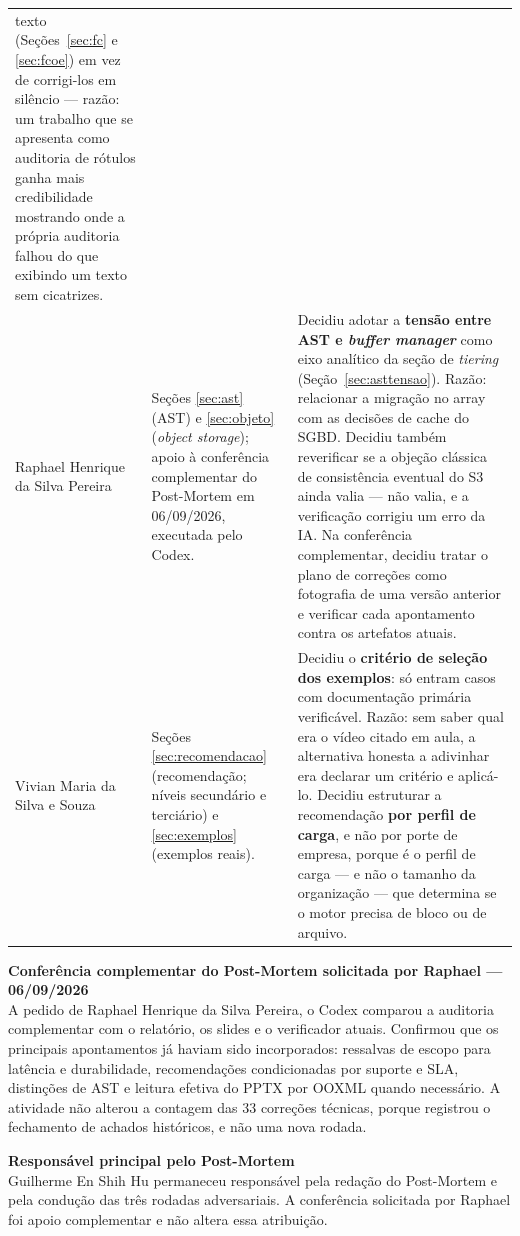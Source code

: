 \documentclass[11pt,a4paper]{article}
\newcommand{\destaque}[2]{%
  \begin{center}\begin{minipage}{0.96\textwidth}
  \colorbox{fundo}{\begin{minipage}{\dimexpr\linewidth-2\fboxsep}
  \vspace{2pt}\textbf{\color{azul}\small #1}\\[1pt]\footnotesize #2\vspace{3pt}
  \end{minipage}}\end{minipage}\end{center}}
\begin{document}
{\begin{longtable}{@{}p{3.7cm}p{4.3cm}p{6.3cm}@{}}
{texto} (Seções~\ref{sec:fc} e \ref{sec:fcoe}) em vez de corrigi-los em silêncio --- razão: um
trabalho que se apresenta como auditoria de rótulos ganha mais credibilidade mostrando onde a
própria auditoria falhou do que exibindo um texto sem cicatrizes. \\
\addlinespace
Raphael Henrique da Silva Pereira &
Seções \ref{sec:ast} (AST) e \ref{sec:objeto} (\textit{object storage}); apoio à conferência
complementar do Post-Mortem em 06/09/2026, executada pelo Codex. &
Decidiu adotar a \textbf{tensão entre AST e \textit{buffer manager}} como eixo analítico da seção de
\textit{tiering} (Seção~\ref{sec:asttensao}). Razão: relacionar a migração no array com as decisões de cache do SGBD. Decidiu também
reverificar se a objeção clássica de consistência eventual do S3 ainda valia --- não valia, e a
verificação corrigiu um erro da IA. Na conferência complementar, decidiu tratar o plano de correções
como fotografia de uma versão anterior e verificar cada apontamento contra os artefatos atuais. \\
\addlinespace
Vivian Maria da Silva e Souza &
Seções \ref{sec:recomendacao} (recomendação; níveis secundário e terciário) e \ref{sec:exemplos}
(exemplos reais). &
Decidiu o \textbf{critério de seleção dos exemplos}: só entram casos com documentação primária
verificável. Razão: sem saber qual era o vídeo citado em aula, a alternativa honesta a adivinhar era
declarar um critério e aplicá-lo. Decidiu estruturar a recomendação \textbf{por perfil de carga}, e
não por porte de empresa, porque é o perfil de carga --- e não o tamanho da organização --- que
determina se o motor precisa de bloco ou de arquivo. \\
\bottomrule
\end{longtable}}

\destaque{Conferência complementar do Post-Mortem solicitada por Raphael --- 06/09/2026}{%
A pedido de Raphael Henrique da Silva Pereira, o Codex comparou a auditoria complementar com o relatório, os slides e o
verificador atuais. Confirmou que os principais apontamentos já haviam sido incorporados: ressalvas
de escopo para latência e durabilidade, recomendações condicionadas por suporte e SLA, distinções de
AST e leitura efetiva do PPTX por OOXML quando necessário. A atividade não alterou a contagem das 33
correções técnicas, porque registrou o fechamento de achados históricos, e não uma nova rodada.}

\destaque{Responsável principal pelo Post-Mortem}{Guilherme En Shih Hu permaneceu responsável pela
redação do Post-Mortem e pela condução das três rodadas adversariais. A conferência solicitada por
Raphael foi apoio complementar e não altera essa atribuição.}
\end{document}
